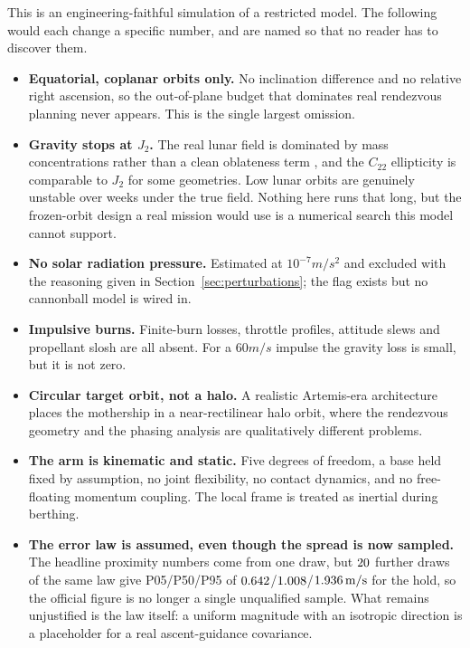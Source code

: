 This is an engineering-faithful simulation of a restricted model. The following
would each change a specific number, and are named so that no reader has to
discover them.

\begin{itemize}
\item \textbf{Equatorial, coplanar orbits only.} No inclination difference and no
      relative right ascension, so the out-of-plane budget that dominates real
      rendezvous planning never appears. This is the single largest omission.
\item \textbf{Gravity stops at $J_2$.} The real lunar field is dominated by mass
      concentrations rather than a clean oblateness term \cite{zuber_grail}, and
      the $C_{22}$ ellipticity is comparable to $J_2$ for some geometries. Low
      lunar orbits are genuinely unstable over weeks under the true field.
      Nothing here runs that long, but the frozen-orbit design a real mission
      would use is a numerical search this model cannot support.
\item \textbf{No solar radiation pressure.} Estimated at $10^{-7}\unit{m/s^2}$
      and excluded with the reasoning given in Section~\ref{sec:perturbations};
      the flag exists but no cannonball model is wired in.
\item \textbf{Impulsive burns.} Finite-burn losses, throttle profiles, attitude
      slews and propellant slosh are all absent. For a $60\unit{m/s}$ impulse the
      gravity loss is small, but it is not zero.
\item \textbf{Circular target orbit, not a halo.} A realistic Artemis-era
      architecture places the mothership in a near-rectilinear halo orbit, where
      the rendezvous geometry and the phasing analysis are qualitatively
      different problems.
\item \textbf{The arm is kinematic and static.} Five degrees of freedom, a base
      held fixed by assumption, no joint flexibility, no contact dynamics, and no
      free-floating momentum coupling. The local frame is treated as inertial
      during berthing.
\item \textbf{The error law is assumed, even though the spread is now sampled.}
      The headline proximity numbers come from one draw, but $20$ further
      draws of the same law give P05/P50/P95 of
      $0.642$/$1.008$/$1.936\,\mathrm{m/s}$ for the hold, so the
      official figure is no longer a single unqualified sample. What remains
      unjustified is the law itself: a uniform magnitude with an isotropic
      direction is a placeholder for a real ascent-guidance covariance.
\end{itemize}

